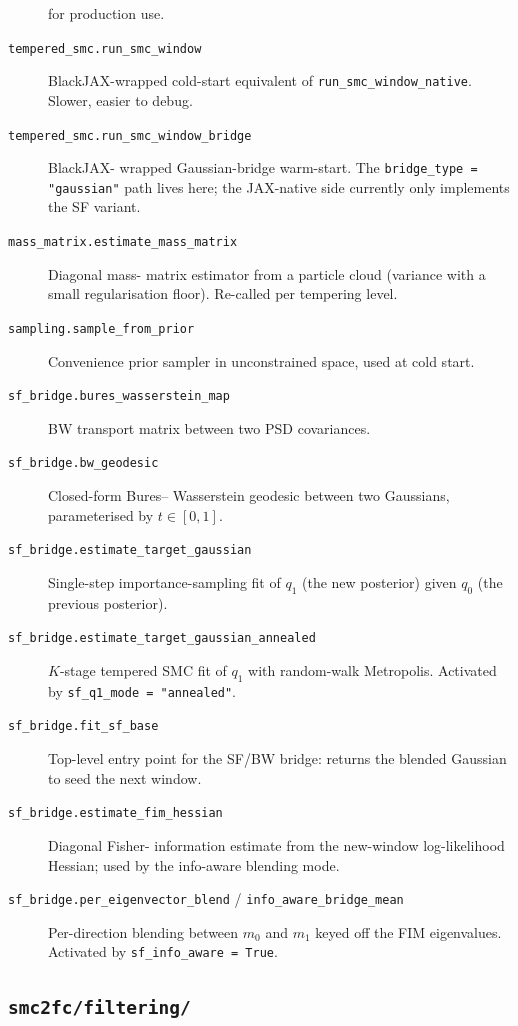 \begin{description}
        for production use.
  \item[\texttt{tempered\_smc.run\_smc\_window}] BlackJAX-wrapped
        cold-start equivalent of
        \texttt{run\_smc\_window\_native}. Slower, easier to debug.
  \item[\texttt{tempered\_smc.run\_smc\_window\_bridge}] BlackJAX-
        wrapped Gaussian-bridge warm-start. The
        \texttt{bridge\_type = "gaussian"} path lives here; the
        JAX-native side currently only implements the SF variant.
  \item[\texttt{mass\_matrix.estimate\_mass\_matrix}] Diagonal mass-
        matrix estimator from a particle cloud (variance with a
        small regularisation floor). Re-called per tempering level.
  \item[\texttt{sampling.sample\_from\_prior}] Convenience prior
        sampler in unconstrained space, used at cold start.
  \item[\texttt{sf\_bridge.bures\_wasserstein\_map}] BW transport
        matrix between two PSD covariances.
  \item[\texttt{sf\_bridge.bw\_geodesic}] Closed-form Bures--
        Wasserstein geodesic between two Gaussians, parameterised by
        $t \in [0, 1]$.
  \item[\texttt{sf\_bridge.estimate\_target\_gaussian}] Single-step
        importance-sampling fit of $q_1$ (the new posterior) given
        $q_0$ (the previous posterior).
  \item[\texttt{sf\_bridge.estimate\_target\_gaussian\_annealed}]
        $K$-stage tempered SMC fit of $q_1$ with random-walk
        Metropolis. Activated by \texttt{sf\_q1\_mode = "annealed"}.
  \item[\texttt{sf\_bridge.fit\_sf\_base}] Top-level entry point for
        the SF/BW bridge: returns the blended Gaussian to seed the
        next window.
  \item[\texttt{sf\_bridge.estimate\_fim\_hessian}] Diagonal Fisher-
        information estimate from the new-window log-likelihood
        Hessian; used by the info-aware blending mode.
  \item[\texttt{sf\_bridge.per\_eigenvector\_blend} /
        \texttt{info\_aware\_bridge\_mean}] Per-direction blending
        between $m_0$ and $m_1$ keyed off the FIM eigenvalues.
        Activated by \texttt{sf\_info\_aware = True}.
\end{description}

\subsection{\texorpdfstring{\texttt{smc2fc/filtering/}}{smc2fc/filtering/}}


